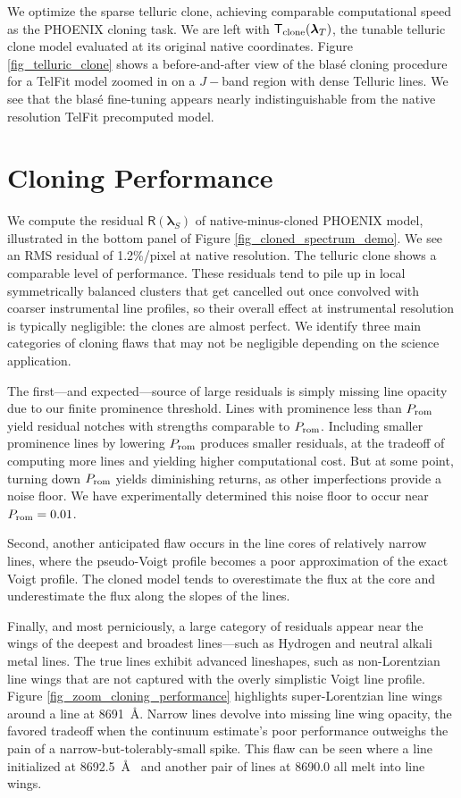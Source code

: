 \documentclass[twocolumn]{aastex631}
\begin{document}
We optimize the sparse telluric clone, achieving comparable computational speed as the PHOENIX cloning task.  We are left with $\mathsf{T}_{\rm clone}(\bm{\lambda}_T)$, the tunable telluric clone model evaluated at its original native coordinates.  Figure \ref{fig_telluric_clone} shows a before-and-after view of the blas\'e cloning procedure for a TelFit model zoomed in on a $J-$band region with dense Telluric lines.  We see that the blas\'e fine-tuning appears nearly indistinguishable from the native resolution TelFit precomputed model.



\section{Cloning Performance}

We compute the residual $\mathsf{R}(\bm{\lambda}_S)$ of native-minus-cloned PHOENIX model, illustrated in the bottom panel of Figure \ref{fig_cloned_spectrum_demo}. We see an RMS residual of 1.2\%/pixel at native resolution.  The telluric clone shows a comparable level of performance.  These residuals tend to pile up in local symmetrically balanced clusters that get cancelled out once convolved with coarser instrumental line profiles, so their overall effect at instrumental resolution is typically negligible: the clones are almost perfect.  We identify three main categories of cloning flaws that may not be negligible depending on the science application.

The first---and expected---source of large residuals is simply missing line opacity due to our finite prominence threshold. Lines with prominence less than $P_{\rm rom}$ yield residual notches with strengths comparable to $P_{\rm rom}$. Including smaller prominence lines by lowering $P_{\rm rom}$ produces smaller residuals, at the tradeoff of computing more lines and yielding higher computational cost.  But at some point, turning down $P_{\rm rom}$ yields diminishing returns, as other imperfections provide a noise floor.  We have experimentally determined this noise floor to occur near $P_{\rm rom}=0.01$.

Second, another anticipated flaw occurs in the line cores of relatively narrow lines, where the pseudo-Voigt profile becomes a poor approximation of the exact Voigt profile.  The cloned model tends to overestimate the flux at the core and underestimate the flux along the slopes of the lines.

Finally, and most perniciously, a large category of residuals appear near the wings of the deepest and broadest lines---such as Hydrogen and neutral alkali metal lines.  The true lines exhibit advanced lineshapes, such as non-Lorentzian line wings that are not captured with the overly simplistic Voigt line profile.  Figure \ref{fig_zoom_cloning_performance} highlights super-Lorentzian line wings around a line at 8691~\AA.  Narrow lines devolve into missing line wing opacity, the favored tradeoff when the continuum estimate's poor performance outweighs the pain of a narrow-but-tolerably-small spike. This flaw can be seen where a line initialized at 8692.5~\AA~ and another pair of lines at 8690.0 all melt into line wings.
\end{document}
